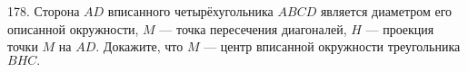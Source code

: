 178. Сторона $AD$ вписанного четырёхугольника $ABCD$ является диаметром его описанной окружности, $M$ --- точка пересечения диагоналей, $H$ --- проекция точки $M$ на $AD.$ Докажите, что $M$ --- центр вписанной окружности треугольника $BHC.$\\
